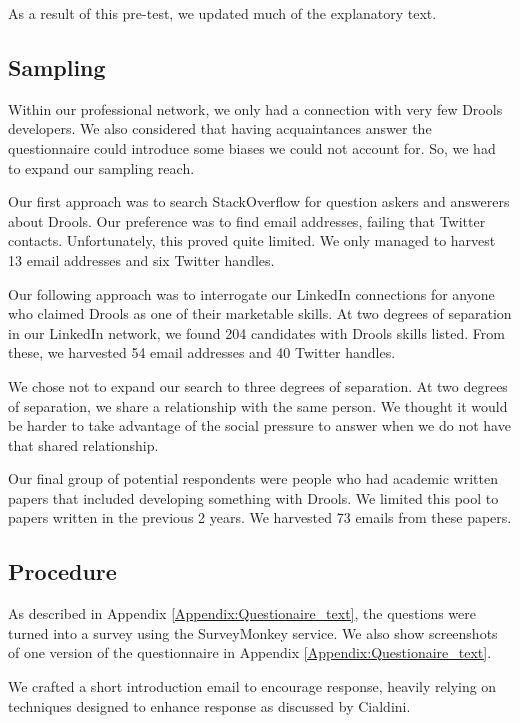 As a result of this pre-test, we updated much of the explanatory text.

\subsection{Sampling}
Within our professional network, we only had a connection with very few Drools developers.
We also considered that having acquaintances answer the questionnaire could introduce some biases we could not account for.
So, we had to expand our sampling reach.

Our first approach was to search StackOverflow for question askers and answerers about Drools.
Our preference was to find email addresses, failing that Twitter contacts.
Unfortunately, this proved quite limited.
We only managed to harvest 13 email addresses and six Twitter handles.

Our following approach was to interrogate our LinkedIn connections for anyone who claimed Drools as one of their marketable skills.
At two degrees of separation in our LinkedIn network, we found 204 candidates with Drools skills listed.
From these, we harvested 54 email addresses and 40 Twitter handles.

We chose not to expand our search to three degrees of separation.
At two degrees of separation, we share a relationship with the same person.
We thought it would be harder to take advantage of the social pressure to answer when we do not have that shared relationship.

Our final group of potential respondents were people who had academic written papers that included developing something with Drools.
We limited this pool to papers written in the previous 2 years.
We harvested 73 emails from these papers.

\subsection{Procedure}
As described in Appendix \ref{Appendix:Questionaire_text}, the questions were turned into a survey using the SurveyMonkey service.
We also show screenshots of one version of the questionnaire in Appendix \ref{Appendix:Questionaire_text}.

We crafted a short introduction email to encourage response, heavily relying on techniques designed to enhance response as discussed by Cialdini\cite{goldstein2008yes}.
